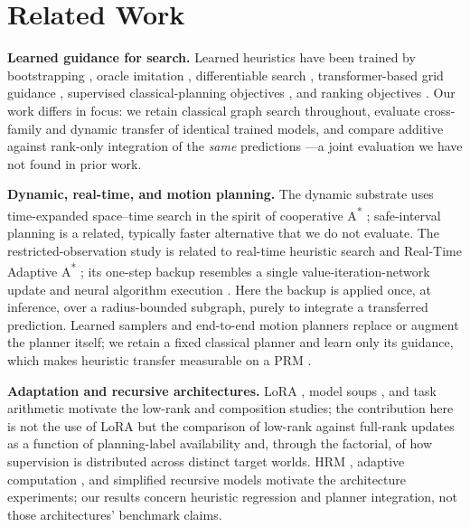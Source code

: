 \documentclass[letterpaper]{article} %
\begin{document}
\section{Related Work}

\textbf{Learned guidance for search.} Learned heuristics have been trained by bootstrapping \citep{arfaee2011bootstrap}, oracle imitation \citep{bhardwaj2017sail}, differentiable search \citep{yonetani2021neuralastar}, transformer-based grid guidance \citep{kirilenko2023transpath}, supervised classical-planning objectives \citep{ferber2020neural}, and ranking objectives \citep{chrestien2023rank}. Our work differs in focus: we retain classical graph search throughout, evaluate cross-family and dynamic transfer of identical trained models, and compare additive against rank-only integration of the \emph{same} predictions \citep{pohl1970,pearl1982semiadmissible,aine2016mha}---a joint evaluation we have not found in prior work.

\textbf{Dynamic, real-time, and motion planning.} The dynamic substrate uses time-expanded space--time search in the spirit of cooperative A\textsuperscript{*} \citep{silver2005cooperative}; safe-interval planning \citep{phillips2011sipp} is a related, typically faster alternative that we do not evaluate. The restricted-observation study is related to real-time heuristic search \citep{korf1990rta} and Real-Time Adaptive A\textsuperscript{*} \citep{koenig2006rtaa}; its one-step backup resembles a single value-iteration-network update \citep{tamar2016vin,lee2018gppn} and neural algorithm execution \citep{velickovic2021nar}. Here the backup is applied once, at inference, over a radius-bounded subgraph, purely to integrate a transferred prediction. Learned samplers and end-to-end motion planners \citep{ichter2018sampling,qureshi2019mpnet} replace or augment the planner itself; we retain a fixed classical planner and learn only its guidance, which makes heuristic transfer measurable on a PRM \citep{kavraki1996prm}.

\textbf{Adaptation and recursive architectures.} LoRA \citep{hu2021lora}, model soups \citep{wortsman2022soups}, and task arithmetic \citep{ilharco2022task} motivate the low-rank and composition studies; the contribution here is not the use of LoRA but the comparison of low-rank against full-rank updates as a function of planning-label availability and, through the factorial, of how supervision is distributed across distinct target worlds. HRM \citep{wang2025hrm}, adaptive computation \citep{graves2016act,banino2021pondernet}, and simplified recursive models \citep{jolicoeur2025trm} motivate the architecture experiments; our results concern heuristic regression and planner integration, not those architectures' benchmark claims.
\end{document}
